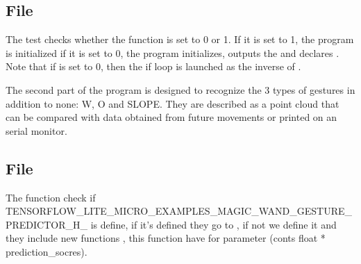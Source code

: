 \begin{center}
    		
    \label{Magic Wand Arduino  output handler}
\end{center}

\subsection{File }

The test checks whether the  function is set to 0 or 1. If it is set to 1, the program is initialized if it is set to 0, the program initializes, outputs the  and declares . Note that if  is set to 0, then the if loop is launched as the inverse of .  

The second part of the program is designed to recognize the 3 types of gestures in addition to none: W, O and SLOPE. They are described as a point cloud that can be compared with data obtained from future movements or printed on an serial monitor. 


\begin{center}
    		
    \label{Magic Wand Arduino output handler}
\end{center}



\subsection{File }


The function  check if  TENSORFLOW\_LITE\_MICRO\_EXAMPLES\_MAGIC\_WAND\_GESTURE\_PREDICTOR\_H\_ is define, if it's defined they go to , if not we define it and they include new functions , this function have for parameter (conts float * prediction\_socres).

\begin{center}
    		
    \label{Magic Wand  gesture predictor}
\end{center}



